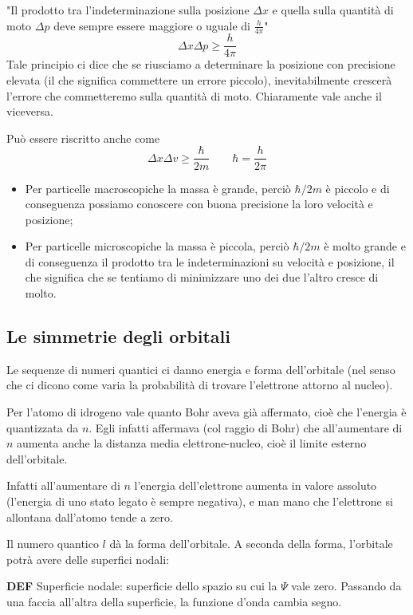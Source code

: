 "Il prodotto tra l'indeterminazione sulla posizione $\Delta x$ e quella sulla quantità di moto $\Delta p$ deve sempre essere maggiore o uguale di $\frac{h}{4 \pi}$"
$$\Delta x \Delta p \geq \frac{h}{4\pi}$$
Tale principio ci dice che se riusciamo a determinare la posizione con precisione elevata (il che significa commettere un errore piccolo), inevitabilmente crescerà l'errore che commetteremo sulla quantità di moto. Chiaramente vale anche il viceversa.

Può essere riscritto anche come
$$\Delta x \Delta v \geq \frac{\hbar}{2m} \qquad \hbar=\frac{h}{2\pi}$$
\begin{itemize}
  \item Per particelle macroscopiche la massa è grande, perciò $\hbar/2m$ è piccolo e di conseguenza possiamo conoscere con buona precisione la loro velocità e posizione;
  \item Per particelle microscopiche la massa è piccola, perciò $\hbar/2m$ è molto grande e di conseguenza il prodotto tra le indeterminazioni su velocità e posizione, il che significa che se tentiamo di minimizzare uno dei due l'altro cresce di molto.
\end{itemize}

\subsection{Le simmetrie degli orbitali}
Le sequenze di numeri quantici ci danno energia e forma dell'orbitale (nel senso che ci dicono come varia la probabilità di trovare l'elettrone attorno al nucleo).

Per l'atomo di idrogeno vale quanto Bohr aveva già affermato, cioè che l'energia è quantizzata da $n$. Egli infatti affermava (col raggio di Bohr) che all'aumentare di $n$ aumenta anche la distanza media elettrone-nucleo, cioè il limite esterno dell'orbitale.

Infatti all'aumentare di $n$ l'energia dell'elettrone aumenta in valore assoluto (l'energia di uno stato legato è sempre negativa), e man mano che l'elettrone si allontana dall'atomo tende a zero.

\vspace{0.2cm}Il numero quantico $l$ dà la forma dell'orbitale. A seconda della forma, l'orbitale potrà avere delle superfici nodali:

\vspace{0.2cm}\textbf{DEF} Superficie nodale: superficie dello spazio su cui la $\Psi$ vale zero. Passando da una faccia all'altra della superficie, la funzione d'onda cambia segno.

